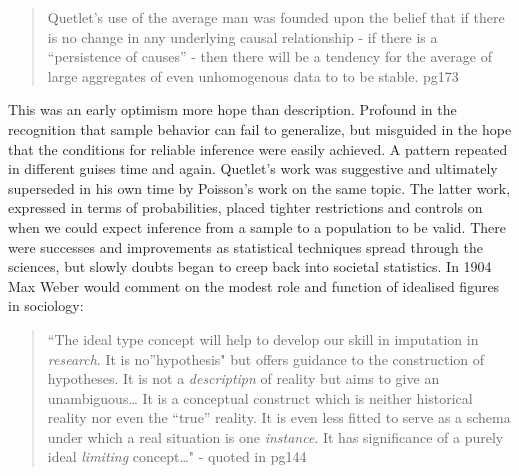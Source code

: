 \documentclass[]{tufte-book}
\theoremstyle{definition}
\theoremstyle{definition}
\theoremstyle{definition}
\theoremstyle{remark}
\begin{document}
\begin{quote}
Quetlet's use of the average man was founded upon the belief that if there is no change in any underlying causal relationship - if there is a ``persistence of causes'' - then there will be a tendency for the average of large aggregates of even unhomogenous data to to be stable.\citep{StiglerHistory} pg173
\end{quote}

This was an early optimism more hope than description. Profound in the recognition that sample behavior can fail to generalize, but misguided in the hope that the conditions for reliable inference were easily achieved. A pattern repeated in different guises time and again. Quetlet's work was suggestive and ultimately superseded in his own time by Poisson's work on the same topic. The latter work, expressed in terms of probabilities, placed tighter restrictions and controls on when we could expect inference from a sample to a population to be valid. There were successes and improvements as statistical techniques spread through the sciences, but slowly doubts began to creep back into societal statistics. In 1904 Max Weber would comment on the modest role and function of idealised figures in sociology:

\begin{quote}
``The ideal type concept will help to develop our skill in imputation in \emph{research}. It is no''hypothesis" but offers guidance to the construction of hypotheses. It is not a \emph{descriptipn} of reality but aims to give an unambiguous\ldots{} It is a conceptual construct which is neither historical reality nor even the ``true'' reality. It is even less fitted to serve as a schema under which a real situation is one \emph{instance}. It has significance of a purely ideal \emph{limiting} concept\ldots" - quoted in \citep{morgan_2012} pg144
\end{quote}
\end{document}
